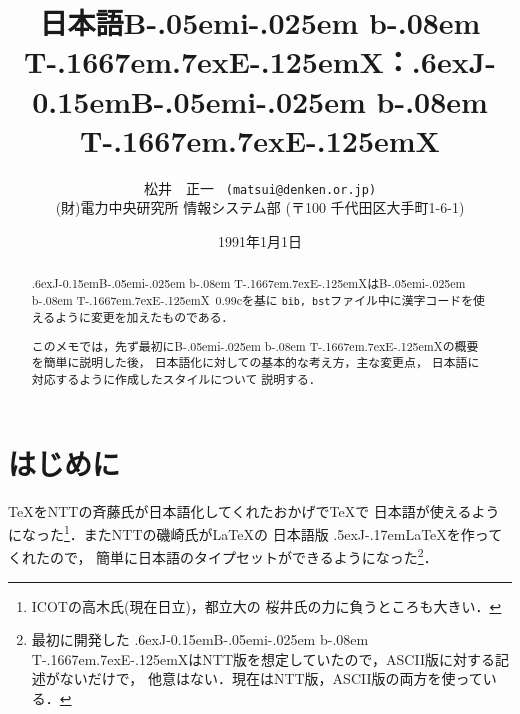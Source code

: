 \def\dg{\gt}
\def\dm{\mc}
\voffset=-2.3cm
\hoffset=-2.3cm
\textheight=25.5cm
\textwidth=16.6cm

\def\JTeX{\leavevmode\lower .5ex\hbox{J}\kern-.17em\TeX}
\def\JLaTeX{\leavevmode\lower.5ex\hbox{J}\kern-.17em\LaTeX}

\def\BibTeX{{\rm B\kern-.05em{\sc i\kern-.025em b}\kern-.08em
    T\kern-.1667em\lower.7ex\hbox{E}\kern-.125emX}}

\def\JBibTeX{\leavevmode\lower .6ex\hbox{J}\kern-0.15em\BibTeX}

\def\myftnote#1{\footnote{\parindent=16pt\hskip-15pt\hang\indent#1\parindent=10pt}}


\def\tstrut{\vrule height 2.346ex depth 0.908ex width 0pt}
\thicksize=0.7pt
\thinsize=0.3pt

\setcounter{topnumber}{3}
\setcounter{bottomnumber}{3}
\setcounter{totalnumber}{6}
\renewcommand{\topfraction}{0.99}
\renewcommand{\bottomfraction}{0.99}
\renewcommand{\textfraction}{0.01}

\title{日本語\BibTeX：\JBibTeX}
\author{松井　正一 {\tt\ (matsui@denken.or.jp)}\\
\normalsize (財)電力中央研究所 情報システム部 (〒100 千代田区大手町1-6-1) }
\date{1991年1月1日}

\baselineskip=16pt

\maketitle

\begin{abstract}

\JBibTeX は\BibTeX\ 0.99cを基に
{\tt bib, bst}ファイル中に漢字コードを使えるように変更を加えたものである．

このメモでは，先ず最初に\BibTeX の概要を簡単に説明した後，
日本語化に対しての基本的な考え方，主な変更点，
日本語に対応するように作成したスタイルについて
説明する．
\end{abstract}

\section{はじめに}

\TeX をNTTの斉藤氏が日本語化してくれたおかげで\TeX で
日本語が使えるようになった\myftnote{ICOTの高木氏(現在日立)，都立大の
桜井氏の力に負うところも大きい．}．またNTTの磯崎氏が\LaTeX の
日本語版 \JLaTeX を作ってくれたので，
簡単に日本語のタイプセットができるようになった\myftnote{最初に開発した
\JBibTeX はNTT版を想定していたので，ASCII版に対する記述がないだけで，
他意はない．現在はNTT版，ASCII版の両方を使っている．}．

